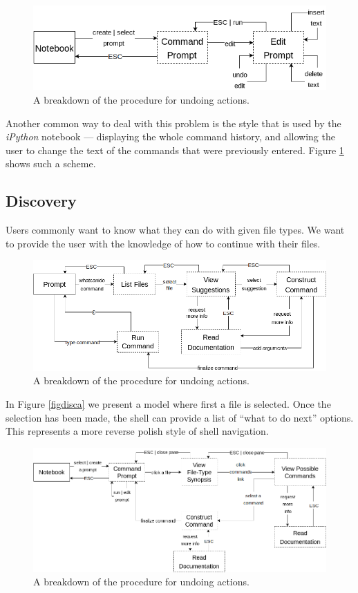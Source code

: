 \begin{figure}[H]
  \centering
  \includegraphics[width=0.8\linewidth]{figures/alternatives/undo_c.png}
  \caption{A breakdown of the procedure for undoing actions.}
  \label{fig:undoc}
\end{figure}

Another common way to deal with this problem is the style that is used by the
\emph{iPython} notebook --- displaying the whole command history, and allowing
the user to change the text of the commands that were previously entered. Figure
\ref{fig:undoc} shows such a scheme.

\subsection{Discovery}

Users commonly want to know what they can do with given file types. We want to
provide the user with the knowledge of how to continue with their files.

\begin{figure}[H]
  \centering
  \includegraphics[width=0.8\linewidth]{figures/alternatives/file_a.png}
  \caption{A breakdown of the procedure for undoing actions.}
  \label{fig:disca}
\end{figure}

In Figure \ref{figdisca} we present a model where first a file is selected. Once
the selection has been made, the shell can provide a list of ``what to do next''
options. This represents a more reverse polish style of shell navigation.

\begin{figure}[H]
  \centering
  \includegraphics[width=0.8\linewidth]{figures/alternatives/file_b.png}
  \caption{A breakdown of the procedure for undoing actions.}
  \label{fig:discb}
\end{figure}

